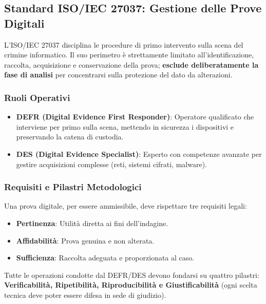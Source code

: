 \documentclass[11pt,a4paper]{article}
\begin{document}
\subsection{Standard ISO/IEC 27037: Gestione delle Prove Digitali}
L'ISO/IEC 27037 disciplina le procedure di primo intervento sulla scena del crimine informatico. Il suo perimetro è strettamente limitato all'identificazione, raccolta, acquisizione e conservazione della prova; \textbf{esclude deliberatamente la fase di analisi} per concentrarsi sulla protezione del dato da alterazioni.

\subsubsection{Ruoli Operativi}
\begin{itemize}
    \item \textbf{DEFR (Digital Evidence First Responder)}: Operatore qualificato che interviene per primo sulla scena, mettendo in sicurezza i dispositivi e preservando la catena di custodia.
    \item \textbf{DES (Digital Evidence Specialist)}: Esperto con competenze avanzate per gestire acquisizioni complesse (reti, sistemi cifrati, malware).
\end{itemize}

\subsubsection{Requisiti e Pilastri Metodologici}
Una prova digitale, per essere ammissibile, deve rispettare tre requisiti legali:
\begin{itemize}
    \item \textbf{Pertinenza}: Utilità diretta ai fini dell'indagine.
    \item \textbf{Affidabilità}: Prova genuina e non alterata.
    \item \textbf{Sufficienza}: Raccolta adeguata e proporzionata al caso.
\end{itemize}

Tutte le operazioni condotte dal DEFR/DES devono fondarsi su quattro pilastri: \textbf{Verificabilità, Ripetibilità, Riproducibilità e Giustificabilità} (ogni scelta tecnica deve poter essere difesa in sede di giudizio).
\end{document}
